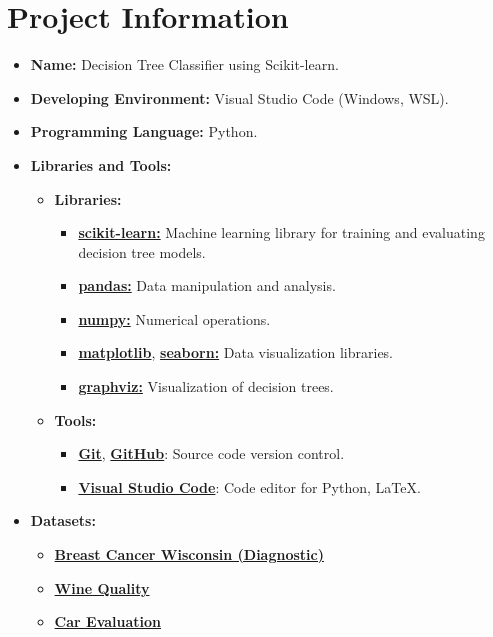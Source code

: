 \section{Project Information}
\begin{itemize}
  \item \textbf{Name:} Decision Tree Classifier using Scikit-learn.
  \item \textbf{Developing Environment:} Visual Studio Code (Windows, WSL).
  \item \textbf{Programming Language:} Python.
  \item \textbf{Libraries and Tools:}
        \begin{itemize}
          \item \textbf{Libraries:}
                \begin{itemize}
                  \item \href{https://scikit-learn.org/stable/}{\textbf{scikit-learn:}} Machine learning library for training and evaluating decision tree models.
                  \item \href{https://pandas.pydata.org/}{\textbf{pandas:}} Data manipulation and analysis.
                  \item \href{https://numpy.org/}{\textbf{numpy:}} Numerical operations.
                  \item \href{https://matplotlib.org/}{\textbf{matplotlib}}, \href{https://seaborn.pydata.org/}{\textbf{seaborn:}} Data visualization libraries.
                  \item \href{https://graphviz.org/}{\textbf{graphviz:}} Visualization of decision trees.
                \end{itemize}
          \item \textbf{Tools:}
                \begin{itemize}
                  \item \href{https://git-scm.com/}{\textbf{Git}}, \href{https://github.com/}{\textbf{GitHub}}: Source code version control.
                  \item \href{https://code.visualstudio.com/}{\textbf{Visual Studio Code}}: Code editor for Python, LaTeX.
                \end{itemize}
        \end{itemize}
  \item \textbf{Datasets:}
        \begin{itemize}
          \item \href{https://archive.ics.uci.edu/dataset/17/breast+cancer+wisconsin+diagnostic}{\textbf{Breast Cancer Wisconsin (Diagnostic)}}
          \item \href{https://archive.ics.uci.edu/dataset/186/wine+quality}{\textbf{Wine Quality}}
          \item \href{https://archive.ics.uci.edu/dataset/19/car+evaluation}{\textbf{Car Evaluation}}
        \end{itemize}
\end{itemize}
